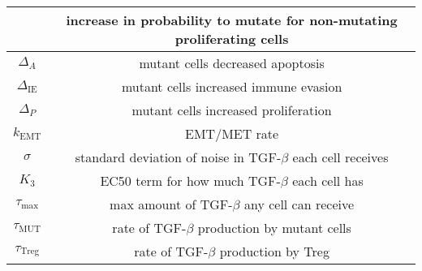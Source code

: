 \documentclass[11pt, a4paper, preprint]{article}
\begin{document}
\begin{center}
\begin{longtable}{|| c | c||}
  \hline
  & increase in probability to mutate for non-mutating proliferating cells  \\
  \hline
  $\Delta_A$ & mutant cells decreased apoptosis  \\
  \hline
  $\Delta_\text{IE}$ & mutant cells increased immune evasion  \\
  \hline
  $\Delta_P$ & mutant cells increased proliferation  \\
  \hline
  $k_\text{EMT}$ & EMT/MET rate  \\
  \hline
  $\sigma$ & standard deviation of noise in TGF-$\beta$ each cell receives  \\
  \hline
  $K_3$ & EC50 term for how much TGF-$\beta$ each cell has \\
  \hline
 $\tau_\text{max}$ & max amount of TGF-$\beta$ any cell can receive \\
  \hline 
 $\tau_\text{MUT}$ & rate of TGF-$\beta$ production by mutant cells\\
  \hline
 $\tau_\text{Treg}$ & rate of TGF-$\beta$ production by Treg\\
  \hline
\end{longtable}
\end{center}

\newpage
\end{document}
